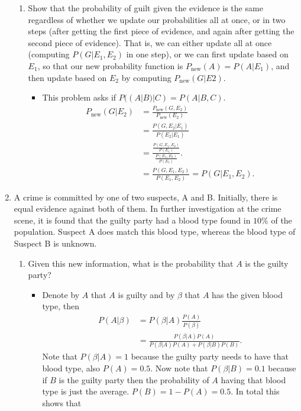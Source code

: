 \documentclass{article}
\begin{document}
\begin{enumerate}
\begin{enumerate}
			\item Show that the probability of guilt given the evidence is the same regardless of whether we update our probabilities all at once, or in two steps (after getting the first piece of evidence, and again after getting the second piece of evidence). That is, we can either update all at once (computing $P(G|E_1, E_2)$ in one step), or we can first update based on $E_1$, so that our new probability function is $P_{\operatorname{new}}(A) = P (A|E_1)$, and then update based on $E_2$ by computing $P_{\operatorname{new}}(G|E 2)$.
				\begin{itemize}
					\item This problem asks if $P((A|B)|C) = P(A|B, C)$.
					$$
					\begin{aligned}
					P_{\operatorname{new}}(G|E_2) &= \frac{P_{\operatorname{new}}(G, E_2)}{P_{\operatorname{new}}(E_2)} \\
					&= \frac{P(G, E_2|E_1)}{P(E_2|E_1)} \\
					&= \frac{\frac{P(G, E_1, E_2)}{P(E_1)}}{\frac{P(E_1, E_2)}{P(E_1)}}. \\
					&= \frac{P(G, E_1, E_2)}{P(E_1, E_2)} = P(G|E_1, E_2).
					\end{aligned}
					$$
				\end{itemize}
		\end{enumerate}
	\item A crime is committed by one of two suspects, A and B. Initially, there is equal evidence against both of them. In further investigation at the crime scene, it is found that the guilty party had a blood type found in $10\%$ of the population. Suspect A does match this blood type, whereas the blood type of Suspect B is unknown.
		\begin{enumerate}
			\item Given this new information, what is the probability that $A$ is the guilty party?
				\begin{itemize}
					\item Denote by $A$ that $A$ is guilty and by $\beta$ that $A$ has the given blood type, then
					$$
					\begin{aligned}
					P(A|\beta) &= P(\beta|A) \frac{P(A)}{P(\beta)} \\
					&= \frac{P(\beta|A)P(A)}{P(\beta|A)P(A) + P(\beta|B)P(B)}.
					\end{aligned}
					$$
					Note that $P(\beta|A) = 1$ because the guilty party needs to have that blood type, also $P(A) = 0.5$. Now note that $P(\beta|B) = 0.1$ because if $B$ is the guilty party then the probability of $A$ having that blood type is just the average. $P(B) = 1 - P(A) = 0.5$. In total this shows that

\end{itemize}
\end{enumerate}
\end{enumerate}
\end{document}
